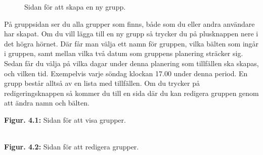 \documentclass{article}
\newcommand*{\img}[1]{%
    \raisebox{-.3\baselineskip}{%
        \texttt{[image: \#1]}%
    }%
}
\begin{document}
{\begin{figure}
            \caption{Sidan för att skapa en ny grupp.}
            \label{fig:groupCreate}
        \end{figure}
        På gruppsidan ser du alla grupper som finns, både som du eller andra användare har skapat. Om du vill lägga till en ny grupp så trycker du på plusknappen \img{images/icons ref/RoundButton.png} nere i det högra hörnet. Där får man välja ett namn för gruppen, vilka bälten som ingår i gruppen, samt mellan vilka två datum som gruppens planering sträcker sig. Sedan får du välja på vilka dagar under denna planering som tillfällen ska skapas, och vilken tid. Exempelvis varje söndag klockan 17.00 under denna period. En grupp består alltså av en lista med tillfällen. Om du trycker på redigeringsknappen \img{images/icons ref/pencil.png} så kommer du till en sida där du kan redigera gruppen genom att ändra namn och bälten.
        
        \begin{figure}[h]
            \label{fig:groupFig}
        \end{figure}
        \noindent\textbf{Figur. 4.1:} Sidan för att visa grupper.\\
        \vspace{-5pt}
        \begin{figure}[h!]
            \label{fig:groupFig}
        \end{figure}\\
        \textbf{Figur. 4.2:} Sidan för att redigera grupper.        

}
\end{document}
